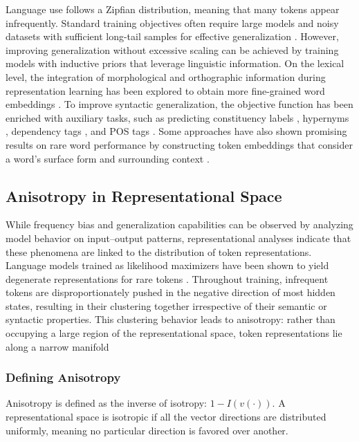 Language use follows a Zipfian distribution, meaning that many tokens appear infrequently. Standard training objectives often require large models and noisy datasets with sufficient long-tail samples for effective generalization \citep{zheng2022memorization}. However, improving generalization without excessive scaling can be achieved by training models with inductive priors that leverage linguistic information. On the lexical level, the integration of morphological and orthographic information during representation learning has been explored to obtain more fine-grained word embeddings \citep{salle2018incorporating, vulic2017morphfitting, cotterel2015morphological, bhatia2016morphological, botha2014compositional}. To improve syntactic generalization, the objective function has been enriched with auxiliary tasks, such as predicting constituency labels \citep{wang2023language}, hypernyms \citep{bai2022better}, dependency tags \citep{cui2022lert}, and POS tags \citep{diehlmartinez2023climb}. Some approaches have also shown promising results on rare word performance by constructing token embeddings that consider a word's surface form and surrounding context \citep{schick2019attentive, schick2020rare}.

\subsection{Anisotropy in Representational Space}
While frequency bias and generalization capabilities can be observed by analyzing model behavior on input--output patterns, representational analyses indicate that these phenomena are linked to the distribution of token representations. Language models trained as likelihood maximizers have been shown to yield degenerate representations for rare tokens \citep{gao2018representation}. Throughout training, infrequent tokens are disproportionately pushed in the negative direction of most hidden states, resulting in their clustering together irrespective of their semantic or syntactic properties. This clustering behavior leads to anisotropy: rather than occupying a large region of the representational space, token representations lie along a narrow manifold \citep{gao2018representation, ethayarajh2019contextual}

\subsubsection{Defining Anisotropy}

Anisotropy is defined as the inverse of isotropy: $1-I(v(\cdot))$. A representational space is isotropic if all the vector directions are distributed uniformly, meaning no particular direction is favored over another.

